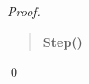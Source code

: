\begin{proof}
\begin{quote}
\begin{enumerate}[label=(\roman*)]
\begin{enumerate}[label=(ii - \alph*)]
      \end{enumerate}

    \end{enumerate}
  \end{quote}

  \begin{quote}
    \textbf{Step()}
  \end{quote}

  \qed
\end{proof}
